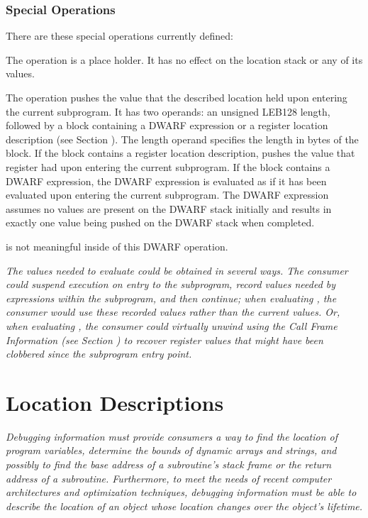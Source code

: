 \subsubsection{Special Operations}
\label{chap:specialoperations}
There 
are these special operations currently defined:
\begin{enumerate}[1. ]
\itembfnl{\DWOPnopTARG}
The \DWOPnopNAME{} operation is a place holder. It has no effect
on the location stack or any of its values.

\itembfnl{\DWOPentryvalueTARG}
The \DWOPentryvalueNAME{} operation pushes 
the value that the described location held
upon entering the current subprogram.  It has two operands: an 
unsigned LEB128 length, followed by 
a block containing a DWARF expression or a register location description 
(see Section ).  
The length operand specifies the length
in bytes of the block.  If the block contains a register location
description, \DWOPentryvalueNAME{} pushes the value that register had upon
entering the current subprogram.  If the block contains a DWARF expression,
the DWARF expression is evaluated as if it has been evaluated upon entering
the current subprogram.  The DWARF expression 
assumes no values are present on the DWARF stack initially and results
in exactly one value being pushed on the DWARF stack when completed.

\DWOPpushobjectaddress{} is not meaningful inside of this DWARF operation.

\textit{The values needed to evaluate \DWOPentryvalueNAME{} could be obtained in
several ways. The consumer could suspend execution on entry to the
subprogram, record values needed by \DWOPentryvalueNAME{} expressions within
the subprogram, and then continue; when evaluating \DWOPentryvalueNAME{},
the consumer would use these recorded values rather than the current
values.  Or, when evaluating \DWOPentryvalueNAME{}, the consumer could
virtually unwind using the Call Frame Information 
(see Section ) 
to recover register values that might have been clobbered since the
subprogram entry point.}

\end{enumerate}

\section{Location Descriptions}
\label{chap:locationdescriptions}
\textit{Debugging information 
must 
provide consumers a way to find
the location of program variables, determine the bounds
of dynamic arrays and strings, and possibly to find the
base address of a subroutine\textquoteright s stack frame or the return
address of a subroutine. Furthermore, to meet the needs of
recent computer architectures and optimization techniques,
debugging information must be able to describe the location of
an object whose location changes over the object\textquoteright s lifetime.}

